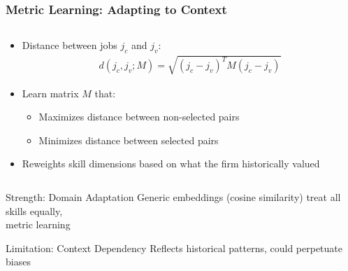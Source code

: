 \documentclass[aspectratio=169]{beamer}
\begin{document}
\begin{frame}
\frametitle{Metric Learning: Adapting to Context}

\begin{comparison}
\begin{column}{0.5\textwidth}
\begin{itemize}
\item Distance between jobs $j_c$ and $j_v$:
\begin{align*}
d(j_c, j_v; M) = \sqrt{(j_c - j_v)^T M (j_c - j_v)}
\end{align*}

\item Learn matrix $M$ that:
\begin{itemize}
\item Maximizes distance between non-selected pairs
\item Minimizes distance between selected pairs
\end{itemize}

\item Reweights skill dimensions based on what the firm historically valued
\end{itemize}
\end{column}

\begin{column}{0.5\textwidth}
\begin{block}{Strength: Domain Adaptation}
Generic embeddings (cosine similarity) treat all skills equally,\\
metric learning 
\end{block}

\begin{block}{Limitation: Context Dependency}
Reflects historical patterns, could perpetuate biases
\end{block}
\end{column}
\end{comparison}

\centering
{}
\end{frame}

\end{document}
